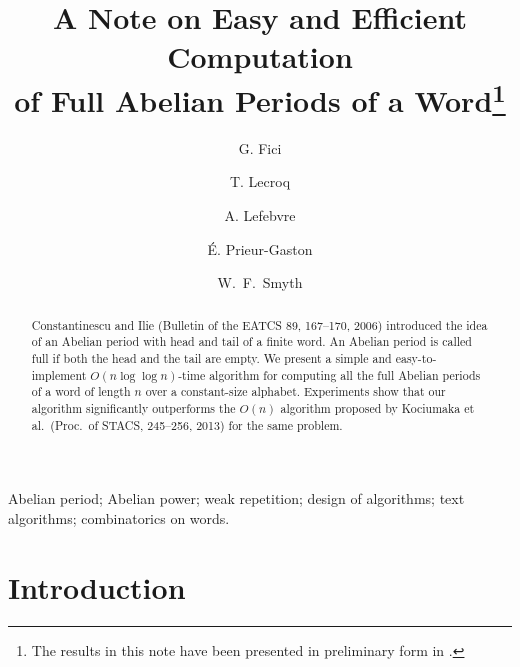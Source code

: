 \documentclass[3p]{elsarticle}
\begin{document}
\title{\textbf{A Note on Easy and Efficient Computation \\of Full Abelian Periods of a Word}\footnote{The results in this note have been presented in preliminary form in \cite{FiLeLePrSm12}.}}

\author[palermo]{G. Fici}

\author[rouen]{T. Lecroq}

\author[rouen]{A. Lefebvre}

\author[rouen]{\'E. Prieur-Gaston}

\author[mcmaster]{W.\ F.\ Smyth}

\address[palermo]{Dipartimento di Matematica e Informatica, Universit\`a di Palermo, Italy}

\address[rouen]{LITIS EA4108, Universit\'e de Rouen, 76821 Mont-Saint-Aignan Cedex, France}

\address[mcmaster]{Dept of Computing and Software, McMaster University,
Hamilton ON L8S 4K1, Canada and Faculty of Engineering \& Information Technology,
 Murdoch University, Murdoch WA 6150, Australia}

\begin{abstract}
Constantinescu and Ilie (Bulletin of the EATCS 89, 167--170, 2006) introduced the idea of an Abelian period with head and tail of a finite word. An Abelian period is called full if both the head and the tail are empty.
We present a simple and easy-to-implement $O(n\log\log n)$-time algorithm for computing all the full Abelian periods of a word of length $n$ over a constant-size alphabet. Experiments show that our algorithm significantly outperforms the $O(n)$ algorithm proposed by Kociumaka et al.~(Proc.~of STACS, 245--256, 2013) for the same problem.
\end{abstract}

\begin{keyword}
Abelian period; Abelian power; weak repetition; design
 of algorithms; text algorithms; combinatorics on words.
\end{keyword}

\maketitle

\section{Introduction}
\end{document}
